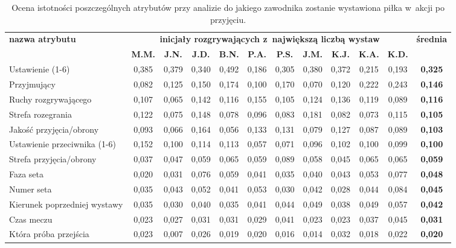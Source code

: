 \documentclass[a4paper,twoside,12pt]{book}
\begin{document}
\begin{table}
\centering
\caption{Ocena istotności poszczególnych atrybutów przy analizie do jakiego zawodnika zostanie wystawiona piłka w~akcji po przyjęciu.}
\label{tab:atrybutyRZawodnikPrzyjęcie}
\begin{adjustbox}{angle=90}
\begin{tabular}{|l|c|c|c|c|c|c|c|c|c|c|c|}
\hline
\multirow{2}{*}{\textbf{nazwa atrybutu}} &
\multicolumn{10}{c|}{\textbf{inicjały rozgrywających z~największą liczbą wystaw}} & 
\multirow{2}{*}{\textbf{średnia}}\\
\cline{2-11} & \textbf{M.M.} & \textbf{J.N.} & \textbf{J.D.} & \textbf{B.N.} & \textbf{P.A.} & \textbf{P.S.} & \textbf{J.M.} & \textbf{K.J.} & \textbf{K.A.} & \textbf{K.D.} &\\
\hline
Ustawienie (1-6) & \cellcolor{green}0,385 & \cellcolor{green}0,379 & \cellcolor{green}0,340 & \cellcolor{green}0,492 & \cellcolor{green}0,186 & \cellcolor{green}0,305 & \cellcolor{green}0,380 & \cellcolor{green}0,372 & 0,215 & 0,193 & \textbf{0,325} \\ \hline
Przyjmujący & 0,082 & 0,125 & 0,150 & 0,174 & 0,100 & 0,170 & 0,070 & 0,120 & \cellcolor{green}0,222 & \cellcolor{green}0,243 & \textbf{0,146} \\ \hline
Ruchy rozgrywającego & 0,107 & 0,065 & 0,142 & 0,116 & 0,155 & 0,105 & 0,124 & 0,136 & 0,119 & 0,089 & \textbf{0,116} \\ \hline
Strefa rozegrania & 0,122 & 0,075 & 0,148 & 0,078 & 0,096 & 0,083 & 0,181 & 0,082 & 0,073 & 0,115 & \textbf{0,105} \\ \hline
Jakość przyjęcia/obrony & 0,093 & 0,066 & 0,164 & 0,056 & 0,133 & 0,131 & 0,079 & 0,127 & 0,087 & 0,089 & \textbf{0,103} \\ \hline
Ustawienie przeciwnika (1-6) & 0,152 & 0,100 & 0,114 & 0,113 & 0,057 & 0,071 & 0,096 & 0,102 & 0,100 & 0,099 & \textbf{0,100} \\ \hline
Strefa przyjęcia/obrony & 0,037 & 0,047 & 0,059 & 0,065 & 0,059 & 0,089 & 0,058 & 0,045 & 0,065 & 0,065 & \textbf{0,059} \\ \hline
Faza seta & 0,020 & 0,031 & 0,076 & 0,059 & 0,041 & 0,035 & 0,040 & 0,043 & 0,053 & 0,077 & \textbf{0,048} \\ \hline
Numer seta & 0,035 & 0,043 & 0,052 & 0,041 & 0,053 & 0,030 & 0,042 & 0,028 & 0,044 & 0,084 & \textbf{0,045} \\ \hline
Kierunek poprzedniej wystawy & 0,035 & 0,030 & 0,040 & 0,035 & 0,041 & 0,044 & 0,049 & 0,038 & 0,049 & 0,057 & \textbf{0,042} \\ \hline
Czas meczu & 0,023 & 0,027 & 0,031 & 0,031 & 0,029 & 0,041 & 0,023 & 0,023 & 0,037 & 0,045 & \textbf{0,031} \\ \hline
Która próba przejścia & 0,023 & 0,007 & 0,026 & 0,019 & 0,020 & 0,016 & 0,014 & 0,032 & 0,018 & 0,022 & \textbf{0,020} \\ \hline
\end{tabular}
\end{adjustbox}
\end{table}
\end{document}
